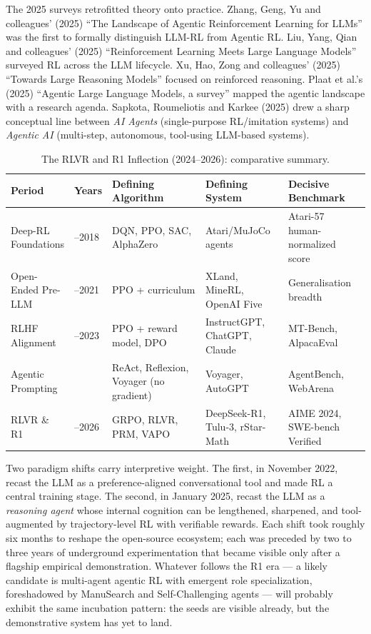 \documentclass{article}
\begin{document}
The 2025 surveys retrofitted theory onto practice. Zhang, Geng, Yu and colleagues' (2025) ``The Landscape of Agentic Reinforcement Learning for LLMs'' was the first to formally distinguish LLM-RL from Agentic RL. Liu, Yang, Qian and colleagues' (2025) ``Reinforcement Learning Meets Large Language Models'' surveyed RL across the LLM lifecycle. Xu, Hao, Zong and colleagues' (2025) ``Towards Large Reasoning Models'' focused on reinforced reasoning. Plaat et al.'s (2025) ``Agentic Large Language Models, a survey'' mapped the agentic landscape with a research agenda. Sapkota, Roumeliotis and Karkee (2025) drew a sharp conceptual line between \emph{AI Agents} (single-purpose RL/imitation systems) and \emph{Agentic AI} (multi-step, autonomous, tool-using LLM-based systems).

\begin{table}[t]
\centering
\caption{The RLVR and R1 Inflection (2024--2026): comparative summary.}
\label{tab:the-rlvr-and-r1-inflection-2024-2026}
\begin{tabular}{>{\raggedright\arraybackslash}p{0.1473\linewidth}
  >{\raggedright\arraybackslash}p{0.0698\linewidth}
  >{\raggedright\arraybackslash}p{0.3023\linewidth}
  >{\raggedright\arraybackslash}p{0.2403\linewidth}
  >{\raggedright\arraybackslash}p{0.2403\linewidth}}
\toprule
Period & Years & Defining Algorithm & Defining System & Decisive Benchmark \\
\midrule
Deep-RL Foundations & 2013--2018 & DQN, PPO, SAC, AlphaZero & Atari/MuJoCo agents & Atari-57 human-normalized score \\
Open-Ended Pre-LLM & 2018--2021 & PPO + curriculum & XLand, MineRL, OpenAI Five & Generalisation breadth \\
RLHF Alignment & 2022--2023 & PPO + reward model, DPO & InstructGPT, ChatGPT, Claude & MT-Bench, AlpacaEval \\
Agentic Prompting & 2023 & ReAct, Reflexion, Voyager (no gradient) & Voyager, AutoGPT & AgentBench, WebArena \\
RLVR \& R1 & 2024--2026 & GRPO, RLVR, PRM, VAPO & DeepSeek-R1, Tulu-3, rStar-Math & AIME 2024, SWE-bench Verified \\
\end{tabular}
\end{table}

Two paradigm shifts carry interpretive weight. The first, in November 2022, recast the LLM as a preference-aligned conversational tool and made RL a central training stage. The second, in January 2025, recast the LLM as a \emph{reasoning agent} whose internal cognition can be lengthened, sharpened, and tool-augmented by trajectory-level RL with verifiable rewards. Each shift took roughly six months to reshape the open-source ecosystem; each was preceded by two to three years of underground experimentation that became visible only after a flagship empirical demonstration. Whatever follows the R1 era --- a likely candidate is multi-agent agentic RL with emergent role specialization, foreshadowed by ManuSearch \citep{huang20252025} and Self-Challenging agents \citep{zhou20252025} --- will probably exhibit the same incubation pattern: the seeds are visible already, but the demonstrative system has yet to land.
\end{document}

